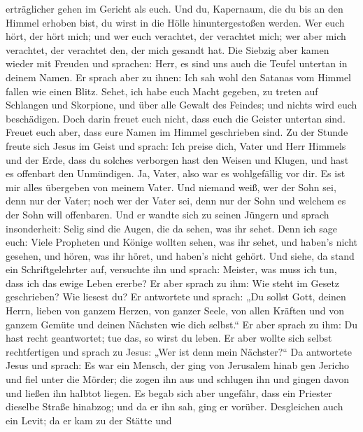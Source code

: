 erträglicher gehen im Gericht als euch.  Und du, Kapernaum,
die du bis an den Himmel erhoben bist, du wirst in die Hölle
hinuntergestoßen werden.  Wer euch hört, der hört mich; und
wer euch verachtet, der verachtet mich; wer aber mich verachtet, der
verachtet den, der mich gesandt hat.  Die Siebzig aber
kamen wieder mit Freuden und sprachen: Herr, es sind uns auch die Teufel
untertan in deinem Namen.  Er sprach aber zu ihnen: Ich sah
wohl den Satanas vom Himmel fallen wie einen Blitz.  Sehet,
ich habe euch Macht gegeben, zu treten auf Schlangen und Skorpione, und
über alle Gewalt des Feindes; und nichts wird euch beschädigen.
 Doch darin freuet euch nicht, dass euch die Geister
untertan sind. Freuet euch aber, dass eure Namen im Himmel geschrieben
sind.  Zu der Stunde freute sich Jesus im Geist und sprach:
Ich preise dich, Vater und Herr Himmels und der Erde, dass du solches
verborgen hast den Weisen und Klugen, und hast es offenbart den
Unmündigen. Ja, Vater, also war es wohlgefällig vor dir. 
Es ist mir alles übergeben von meinem Vater. Und niemand weiß, wer der
Sohn sei, denn nur der Vater; noch wer der Vater sei, denn nur der Sohn
und welchem es der Sohn will offenbaren.  Und er wandte
sich zu seinen Jüngern und sprach insonderheit: Selig sind die Augen,
die da sehen, was ihr sehet.  Denn ich sage euch: Viele
Propheten und Könige wollten sehen, was ihr sehet, und haben's nicht
gesehen, und hören, was ihr höret, und haben's nicht gehört.
 Und siehe, da stand ein Schriftgelehrter auf, versuchte
ihn und sprach: Meister, was muss ich tun, dass ich das ewige Leben
ererbe?  Er aber sprach zu ihm: Wie steht im Gesetz
geschrieben? Wie liesest du?  Er antwortete und sprach: „Du
sollst Gott, deinen Herrn, lieben von ganzem Herzen, von ganzer Seele,
von allen Kräften und von ganzem Gemüte und deinen Nächsten wie dich
selbst.``  Er aber sprach zu ihm: Du hast recht
geantwortet; tue das, so wirst du leben.  Er aber wollte
sich selbst rechtfertigen und sprach zu Jesus: „Wer ist denn mein
Nächster?{}``  Da antwortete Jesus und sprach: Es war ein
Mensch, der ging von Jerusalem hinab gen Jericho und fiel unter die
Mörder; die zogen ihn aus und schlugen ihn und gingen davon und ließen
ihn halbtot liegen.  Es begab sich aber ungefähr, dass ein
Priester dieselbe Straße hinabzog; und da er ihn sah, ging er vorüber.
 Desgleichen auch ein Levit; da er kam zu der Stätte und
